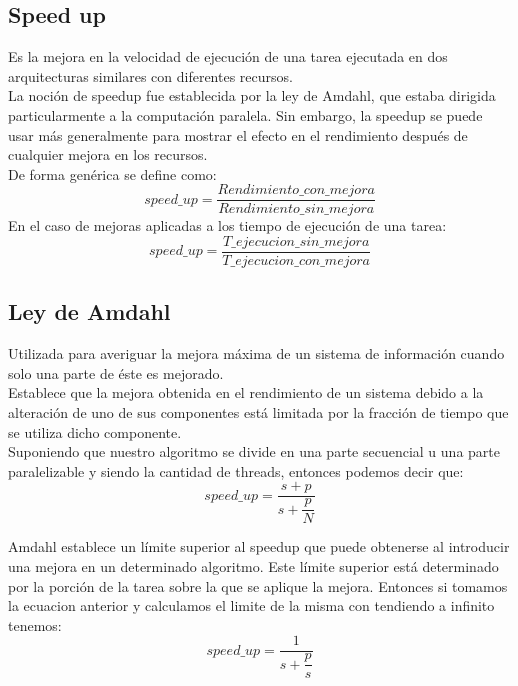 \subsection{Speed up}

Es la mejora en la velocidad de ejecución de una tarea ejecutada en dos
arquitecturas similares con diferentes recursos.\\
La noción de speedup fue establecida por la ley de Amdahl, que estaba
dirigida particularmente a la computación paralela. Sin embargo, la speedup se
puede usar más generalmente para mostrar el efecto en el rendimiento después de
cualquier mejora en los recursos.\\
De forma genérica se define como:
\begin{equation}
    speed\_up = \dfrac{Rendimiento\_con\_mejora}{Rendimiento\_sin\_mejora}
\end{equation}
En el caso de mejoras aplicadas a los tiempo de ejecución de una tarea:
\begin{equation}
    speed\_up = \dfrac{T\_ejecucion\_sin\_mejora}{T\_ejecucion\_con\_mejora}
\end{equation}

\subsection{Ley de Amdahl}

Utilizada para averiguar la mejora máxima de un sistema de información cuando
solo una parte de éste es mejorado.\\
Establece que la mejora obtenida en el rendimiento de un sistema debido a la
alteración de uno de sus componentes está limitada por la fracción de tiempo
que se utiliza dicho componente.\\

Suponiendo que nuestro algoritmo se divide en una parte secuencial 
u una parte paralelizable  y siendo  la cantidad de threads,
entonces podemos decir que:
\begin{equation}
    speed\_up = \dfrac{s+p}{s+\dfrac{p}{N}}
\end{equation}

Amdahl establece un límite superior al speedup que puede obtenerse al
introducir una mejora en un determinado algoritmo. Este límite superior está
determinado por la porción de la tarea sobre la que se aplique la mejora.
Entonces si tomamos la ecuacion anterior y calculamos el limite de la misma con
 tendiendo a infinito tenemos:
\begin{equation}
    speed\_up = \dfrac{1}{s+\dfrac{p}{s}}
\end{equation}
\newpage

